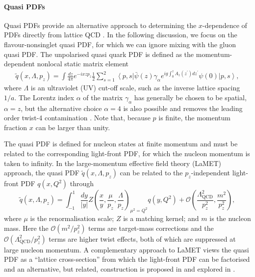 \paragraph{Quasi PDFs}
Quasi PDFs provide an alternative approach to determining the $x$-dependence of PDFs directly from lattice QCD \cite{Ji:2013dva,Ji:2014gla}. In the following discussion, we focus on the flavour-nonsinglet quasi PDF, for which we can ignore mixing with the gluon quasi PDF. The unpolarised quasi quark PDF is defined as the momentum-dependent
nonlocal static matrix element
\begin{align}\label{eq:qPDF}
\widetilde{q}(x,\Lambda,p_z)  = \int \frac{dz}{4\pi} e^{-i x z p_z} 
\frac{1}{2}\sum_{s=1}^2\left\langle p,s\right\vert \bar{\psi}(z)\gamma_\alpha e^{ig\int_0^z
A_z(z^\prime) dz^\prime} \psi(0) \left\vert p,s\right\rangle ,
\end{align}
where $\Lambda$ is an ultraviolet (UV) cut-off scale, such as the inverse lattice spacing $1/a$. The Lorentz index $\alpha$ of the matrix $\gamma_\alpha$ has generally be chosen to be spatial, $\alpha = z$, but the alternative choice $\alpha = 4$ is also possible and removes the leading order twist-4 contamination \cite{Radyushkin:2016hsy}. Note that, because $p$ is finite, the momentum fraction $x$ can be larger than unity.

The quasi PDF is defined for nucleon states at finite momentum and must be related to the corresponding light-front PDF, for which the nucleon momentum is taken to infinity.
In the  large-momentum  effective field theory (LaMET) approach, the quasi PDF $\widetilde{q}(x,\Lambda,p_z)$ can be related to the $p_z$-independent
light-front PDF $q(x,Q^2)$ through~\cite{Ji:2013dva,Ji:2014gla}
\begin{equation} \label{eq:qPDFmatching}
\widetilde{q}(x,\Lambda ,p_z) = 
  \int_{-1}^1 \frac{dy}{\left\vert y\right\vert} 
    Z\left( \frac{x}{y}, \frac{\mu}{p_z}, \frac{\Lambda}{p_z}\right)_{\mu^2 = Q^2} q(y,Q^2) +
  \mathcal{O}\left( \frac{\Lambda_\text{QCD}^2}{p_z^2},\frac{m^2}{p_z^2}\right), 
\end{equation}
where $\mu$ is the renormalisation scale;
$Z$ is a matching kernel; and $m$ is the nucleon mass.
Here the $\mathcal{O}\left(m^2/p_z^2\right)$ terms are target-mass corrections and the $ \mathcal{O}\left(\Lambda_\text{QCD}^2/p_z^2\right)$ terms are higher twist effects, both of which are suppressed at large nucleon momentum. A complementary approach to LaMET views the quasi PDF as a ``lattice cross-section'' from which the light-front PDF can be factorised \cite{Ma:2014jla, Ma:2014jga} and an alternative, but related, construction is proposed in \cite{Radyushkin:2016hsy,Radyushkin:2017cyf} and explored in \cite{Orginos:2017kos}.

